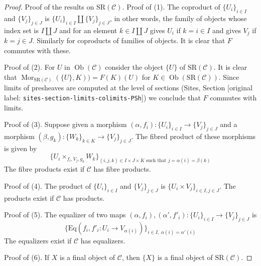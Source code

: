 \documentclass[10pt,a4paper]{article}
\theoremstyle{plain}
\theoremstyle{definition}
\theoremstyle{remark}
\numberwithin{equation}{subsection}
\def\Mor{\mathop{\mathrm{Mor}}\nolimits}
\def\Ob{\mathop{\mathrm{Ob}}\nolimits}
\begin{document}
\begin{proof}
Proof of the results on $\text{SR}(\mathcal{C})$.
Proof of (1). The coproduct of $\{U_i\}_{i \in I}$ and $\{V_j\}_{j \in J}$ is
$\{U_i\}_{i \in I} \amalg \{V_j\}_{j \in J}$, in other words, the family
of objects whose index set is $I \amalg J$ and for an element
$k \in I \amalg J$ gives $U_i$ if $k = i \in I$ and gives $V_j$ if
$k = j \in J$. Similarly for coproducts
of families of objects. It is clear that $F$ commutes with these.

\medskip\noindent
Proof of (2). For $U$ in $\Ob(\mathcal{C})$ consider the object $\{U\}$ of
$\text{SR}(\mathcal{C})$. It is clear that
$\Mor_{\text{SR}(\mathcal{C})}(\{U\}, K)) = F(K)(U)$
for $K \in \Ob(\text{SR}(\mathcal{C}))$. Since limits of presheaves
are computed at the level of sections
(Sites, Section \textnormal{[original label: \nolinkurl{sites-section-limits-colimits-PSh}]})
we conclude that $F$ commutes with limits.

\medskip\noindent
Proof of (3). Suppose given a morphism
$(\alpha, f_i) : \{U_i\}_{i \in I} \to \{V_j\}_{j \in J}$
and a morphism
$(\beta, g_k) : \{W_k\}_{k \in K} \to \{V_j\}_{j \in J}$.
The fibred product of these morphisms is given by
$$
\{ U_i \times_{f_i, V_j, g_k} W_k\}_{(i, j, k) \in I \times J \times K
\text{ such that } j = \alpha(i) = \beta(k)}
$$
The fibre products exist if $\mathcal{C}$ has fibre products.

\medskip\noindent
Proof of (4). The product of $\{U_i\}_{i \in I}$ and $\{V_j\}_{j \in J}$ is
$\{U_i \times V_j\}_{i \in I, j \in J}$. The products exist if
$\mathcal{C}$ has products.

\medskip\noindent
Proof of (5). The equalizer of two maps
$(\alpha, f_i), (\alpha', f'_i) : \{U_i\}_{i \in I} \to \{V_j\}_{j \in J}$
is
$$
\{
\text{Eq}(f_i, f'_i : U_i \to V_{\alpha(i)})
\}_{i \in I,\ \alpha(i) = \alpha'(i)}
$$
The equalizers exist if $\mathcal{C}$ has equalizers.

\medskip\noindent
Proof of (6). If $X$ is a final object of $\mathcal{C}$, then
$\{X\}$ is a final object of $\text{SR}(\mathcal{C})$.


\end{proof}
\end{document}

